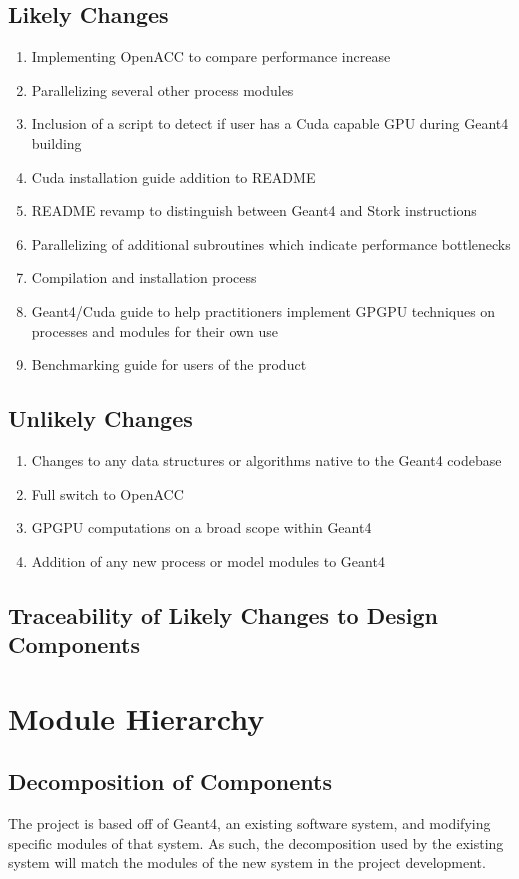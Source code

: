 \documentclass[12pt]{article}
\begin{document}
\subsection{Likely Changes} %
\begin{enumerate}
\item Implementing OpenACC to compare performance increase
\item Parallelizing several other process modules
\item Inclusion of a script to detect if user has a Cuda capable GPU during Geant4 building
\item Cuda installation guide addition to README
\item README revamp to distinguish between Geant4 and Stork instructions
\item Parallelizing of additional subroutines which indicate performance bottlenecks
\item Compilation and installation process
\item Geant4/Cuda guide to help practitioners implement GPGPU techniques on processes and modules for their own use
\item Benchmarking guide for users of the product
\end{enumerate}

\subsection{Unlikely Changes} %
\begin{enumerate}
\item Changes to any data structures or algorithms native to the Geant4 codebase
\item Full switch to OpenACC
\item GPGPU computations on a broad scope within Geant4
\item Addition of any new process or model modules to Geant4
\end{enumerate}

\subsection{Traceability of Likely Changes to Design Components}

\section{Module Hierarchy}%
\subsection{Decomposition of Components}
The project is based off of Geant4, an existing software system, and modifying specific modules of that system. As such, the decomposition used by the existing system will match the modules of the new system in the project development.\\
\end{document}
